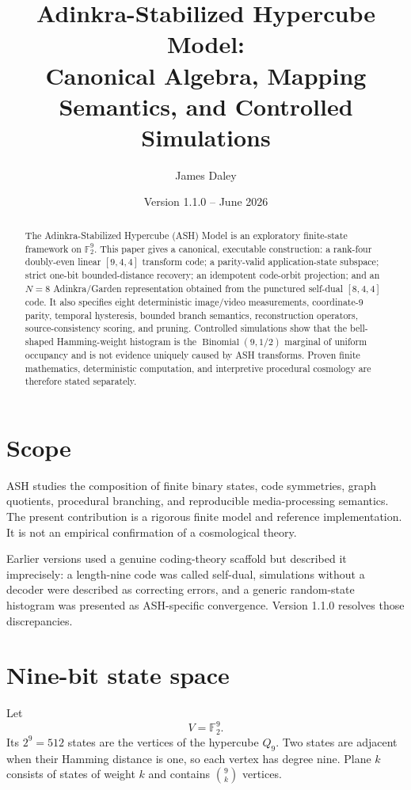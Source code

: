 \documentclass[11pt]{article}
\title{Adinkra-Stabilized Hypercube Model:\\Canonical Algebra, Mapping Semantics, and Controlled Simulations}
\author{James Daley}
\date{Version 1.1.0 -- June 2026}
\begin{document}
\maketitle

\begin{abstract}
The Adinkra-Stabilized Hypercube (ASH) Model is an exploratory finite-state framework on $\mathbb F_2^9$.  This paper gives a canonical, executable construction: a rank-four doubly-even linear $[9,4,4]$ transform code; a parity-valid application-state subspace; strict one-bit bounded-distance recovery; an idempotent code-orbit projection; and an $N=8$ Adinkra/Garden representation obtained from the punctured self-dual $[8,4,4]$ code.  It also specifies eight deterministic image/video measurements, coordinate-9 parity, temporal hysteresis, bounded branch semantics, reconstruction operators, source-consistency scoring, and pruning.  Controlled simulations show that the bell-shaped Hamming-weight histogram is the $\operatorname{Binomial}(9,1/2)$ marginal of uniform occupancy and is not evidence uniquely caused by ASH transforms.  Proven finite mathematics, deterministic computation, and interpretive procedural cosmology are therefore stated separately.
\end{abstract}

\section{Scope}
ASH studies the composition of finite binary states, code symmetries, graph quotients, procedural branching, and reproducible media-processing semantics.  The present contribution is a rigorous finite model and reference implementation.  It is not an empirical confirmation of a cosmological theory.

Earlier versions used a genuine coding-theory scaffold but described it imprecisely: a length-nine code was called self-dual, simulations without a decoder were described as correcting errors, and a generic random-state histogram was presented as ASH-specific convergence.  Version 1.1.0 resolves those discrepancies.

\section{Nine-bit state space}
Let
\[
V=\mathbb F_2^9.
\]
Its $2^9=512$ states are the vertices of the hypercube $Q_9$.  Two states are adjacent when their Hamming distance is one, so each vertex has degree nine.  Plane $k$ consists of states of weight $k$ and contains $\binom{9}{k}$ vertices.
\end{document}
